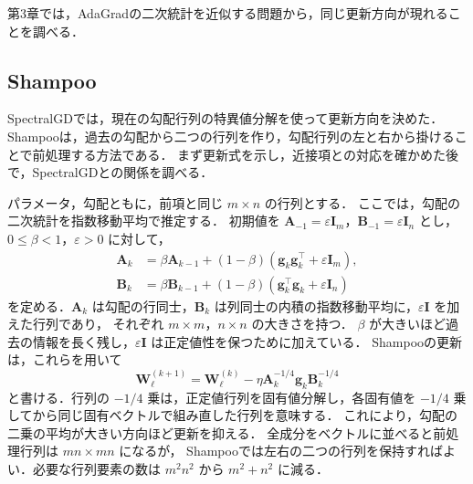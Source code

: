 \documentclass[../main.tex]{subfiles}
\begin{document}
第3章では，AdaGradの二次統計を近似する問題から，同じ更新方向が現れることを調べる．

\subsection{Shampoo}

SpectralGDでは，現在の勾配行列の特異値分解を使って更新方向を決めた．
Shampooは，過去の勾配から二つの行列を作り，勾配行列の左と右から掛けることで前処理する方法である\cite{gupta2018shampoo}．
まず更新式を示し，近接項との対応を確かめた後で，SpectralGDとの関係を調べる．

パラメータ，勾配ともに，前項と同じ $m\times n$ の行列とする．
ここでは，勾配の二次統計を指数移動平均で推定する．
初期値を $\bm{A}_{-1}=\varepsilon\bm{I}_m$，$\bm{B}_{-1}=\varepsilon\bm{I}_n$ とし，
$0\leq\beta<1$，$\varepsilon>0$ に対して，
\begin{equation}
  \begin{aligned}
    \bm{A}_k&=\beta\bm{A}_{k-1}
      +(1-\beta)(\bm{g}_k\bm{g}_k^\top+\varepsilon\bm{I}_m),\\
    \bm{B}_k&=\beta\bm{B}_{k-1}
      +(1-\beta)(\bm{g}_k^\top\bm{g}_k+\varepsilon\bm{I}_n)
  \end{aligned}
  \label{eq:md-shampoo-statistics}
\end{equation}
を定める．$\bm{A}_k$ は勾配の行同士，$\bm{B}_k$ は列同士の内積の指数移動平均に，$\varepsilon\bm{I}$ を加えた行列であり，
それぞれ $m\times m$，$n\times n$ の大きさを持つ．
$\beta$ が大きいほど過去の情報を長く残し，$\varepsilon\bm{I}$ は正定値性を保つために加えている．
Shampooの更新は，これらを用いて
\begin{equation}
  \bm{W}_\ell^{(k+1)}
  =\bm{W}_\ell^{(k)}-\eta\bm{A}_k^{-1/4}\bm{g}_k\bm{B}_k^{-1/4}
  \label{eq:md-shampoo-update}
\end{equation}
と書ける．行列の $-1/4$ 乗は，正定値行列を固有値分解し，各固有値を $-1/4$ 乗してから同じ固有ベクトルで組み直した行列を意味する．
これにより，勾配の二乗の平均が大きい方向ほど更新を抑える．
全成分をベクトルに並べると前処理行列は $mn\times mn$ になるが，
Shampooでは左右の二つの行列を保持すればよい．必要な行列要素の数は $m^2n^2$ から $m^2+n^2$ に減る．
\end{document}
